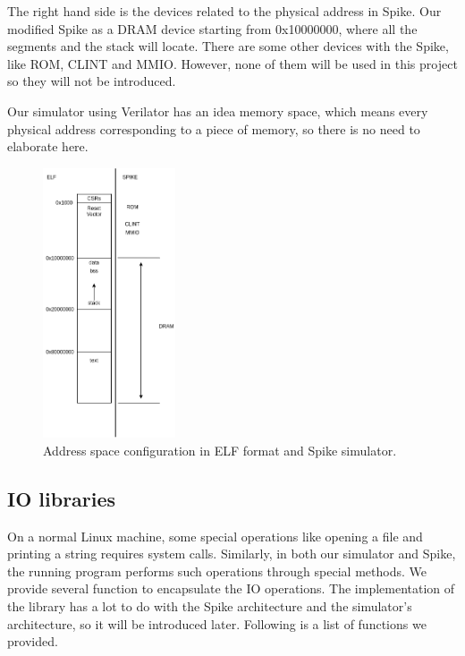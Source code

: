 The right hand side is the devices related to the physical address in Spike. Our modified Spike as a DRAM device starting from 0x10000000, where all the segments and the stack will locate. There are some other devices with the Spike, like ROM, CLINT and MMIO. However, none of them will be used in this project so they will not be introduced. 

Our simulator using Verilator has an idea memory space, which means every physical address corresponding to a piece of memory, so there is no need to elaborate here. 

\begin{figure}[!htp]
    \centering
    \includegraphics[width=0.35\textwidth]{figure/450-mem.png}
    \caption{Address space configuration in ELF format and Spike simulator.}
    \label{fig:450-addr-sapce}
\end{figure}

\subsection{IO libraries} %
On a normal Linux machine, some special operations like opening a file and printing a string requires system calls. Similarly, in both our simulator and Spike, the running program performs such operations through special methods. We provide several function to encapsulate the IO operations. The implementation of the library has a lot to do with the Spike architecture and the simulator's architecture, so it will be introduced later. Following is a list of functions we provided.

